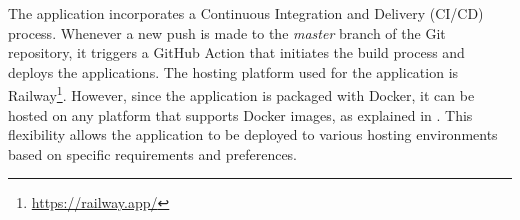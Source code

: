 The application incorporates a Continuous Integration and Delivery (CI/CD)
process. Whenever a new push is made to the \textit{master} branch of the Git
repository, it triggers a GitHub Action that initiates the build process and
deploys the applications. The hosting platform used for the application is
Railway\footnote{\url{https://railway.app/}}. However, since the application is
packaged with Docker, it can be hosted on any platform that supports Docker
images, as explained in . This flexibility allows the
application to be deployed to various hosting environments based on specific
requirements and preferences.
